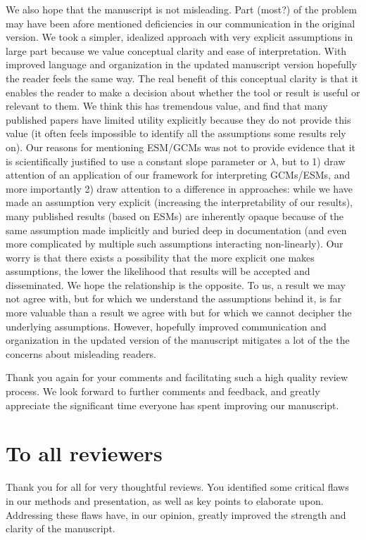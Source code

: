 \documentclass[12pt]{article}
\begin{document}
We also hope that the manuscript is not misleading. Part (most?)  of
the problem may have been afore mentioned deficiencies in our
communication in the original version. We took a simpler, idealized
approach with very explicit assumptions in large part because we value
conceptual clarity and ease of interpretation. With improved language
and organization in the updated manuscript version hopefully the
reader feels the same way. The real benefit of this conceptual clarity
is that it enables the reader to make a decision about whether the
tool or result is useful or relevant to them. We think this has
tremendous value, and find that many published papers have limited
utility explicitly because they do not provide this value (it often
feels impossible to identify all the assumptions some results rely
on). Our reasons for mentioning ESM/GCMs was not to provide evidence
that it is scientifically justified to use a constant slope parameter
or $\lambda$, but to 1) draw attention of an application of our
framework for interpreting GCMs/ESMs, and more importantly 2) draw
attention to a difference in approaches: while we have made an
assumption very explicit (increasing the interpretability of our
results), many published results (based on ESMs) are inherently opaque
because of the same assumption made implicitly and buried deep in
documentation (and even more complicated by multiple such assumptions
interacting non-linearly). Our worry is that there exists a
possibility that the more explicit one makes assumptions, the lower
the likelihood that results will be accepted and disseminated. We hope
the relationship is the opposite. To us, a result we may not agree
with, but for which we understand the assumptions behind it, is far
more valuable than a result we agree with but for which we cannot
decipher the underlying assumptions. However, hopefully improved
communication and organization in the updated version of the
manuscript mitigates a lot of the the concerns about misleading
readers.

Thank you again for your comments and facilitating such a high quality
review process. We look forward to further comments and feedback, and
greatly appreciate the significant time everyone has spent improving
our manuscript.


\section{To all reviewers}

Thank you for all for very thoughtful reviews. You identified some
critical flaws in our methods and presentation, as well as key points
to elaborate upon. Addressing these flaws have, in our opinion,
greatly improved the strength and clarity of the manuscript.
\end{document}
